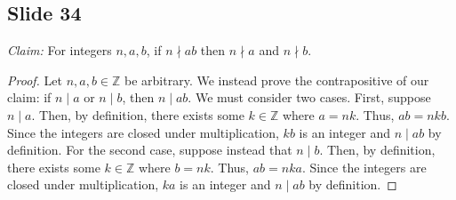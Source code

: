 \documentclass[12pt]{article}
\begin{document}
\subsection*{Slide 34}

\textit{Claim:} For integers $n,a,b$, if $n \nmid ab$ then $n \nmid a$ and $n
\nmid b$.

\begin{proof}
  Let $n,a,b \in \mathbb{Z}$ be arbitrary. 
  We instead prove the contrapositive of our claim: 
  if $n \mid a$ or $n \mid b$, then $n \mid ab$.
  We must consider two cases.
  First, suppose $n \mid a$.
  Then, by definition, there exists some $k \in \mathbb{Z}$ 
  where $a = nk$.
  Thus, $ab = nkb$.
  Since the integers are closed under multiplication, $kb$ is an integer and $n \mid ab$ by definition.
  For the second case, suppose instead that $n \mid b$.
  Then, by definition, there exists some $k \in \mathbb{Z}$ 
  where $b = nk$.
  Thus, $ab = nka$.
  Since the integers are closed under multiplication, $ka$ is an integer and $n \mid ab$ by definition.

\end{proof}
\end{document}
